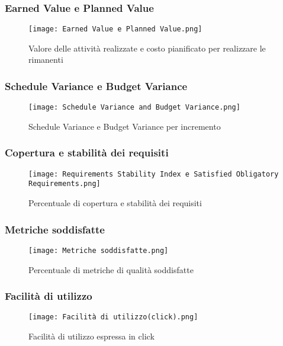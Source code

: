     \subsubsection{Earned Value e Planned Value}
    \begin{figure}[H]
      \centering
      \texttt{[image: Earned Value e Planned Value.png]}
      \caption{Valore delle attività realizzate e costo pianificato per realizzare le rimanenti}
    \end{figure}

    \subsubsection{Schedule Variance e Budget Variance}
    \begin{figure}[H]
      \centering
      \texttt{[image: Schedule Variance and Budget Variance.png]}
      \caption{Schedule Variance e Budget Variance per incremento}
    \end{figure}

    \subsubsection{Copertura e stabilità dei requisiti}
    \begin{figure}[H]
      \centering
      \texttt{[image: Requirements Stability Index e Satisfied Obligatory Requirements.png]}
      \caption{Percentuale di copertura e stabilità dei requisiti}
    \end{figure}

    \subsubsection{Metriche soddisfatte}
    \begin{figure}[H]
      \centering
      \texttt{[image: Metriche soddisfatte.png]}
      \caption{Percentuale di metriche di qualità soddisfatte}
    \end{figure}

    \subsubsection{Facilità di utilizzo}
    \begin{figure}[H]
      \centering
      \texttt{[image: Facilità di utilizzo(click).png]}
      \caption{Facilità di utilizzo espressa in click}
    \end{figure}

